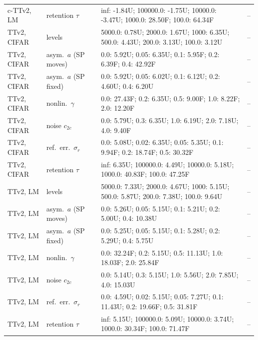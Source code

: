 \begin{table}[p]
\begin{tabular}{llp{8.8cm}l}
c-TTv2, LM & retention $\tau$ & inf: -1.84U; 100000.0: -1.75U; 10000.0: -3.47U; 1000.0: 28.50F; 100.0: 64.34F & --\\
TTv2, CIFAR & levels & 5000.0: 0.78U; 2000.0: 1.67U; 1000: 6.35U; 500.0: 4.43U; 200.0: 3.13U; 100.0: 3.12U & --\\
TTv2, CIFAR & asym.\ $a$ (SP moves) & 0.0: 5.92U; 0.05: 6.35U; 0.1: 5.95F; 0.2: 6.39F; 0.4: 42.92F & --\\
TTv2, CIFAR & asym.\ $a$ (SP fixed) & 0.0: 5.92U; 0.05: 6.02U; 0.1: 6.12U; 0.2: 4.60U; 0.4: 6.20U & --\\
TTv2, CIFAR & nonlin.\ $\gamma$ & 0.0: 27.43F; 0.2: 6.35U; 0.5: 9.00F; 1.0: 8.22F; 2.0: 12.20F & --\\
TTv2, CIFAR & noise $c_{2c}$ & 0.0: 5.79U; 0.3: 6.35U; 1.0: 6.19U; 2.0: 7.18U; 4.0: 9.40F & --\\
TTv2, CIFAR & ref.\ err.\ $\sigma_r$ & 0.0: 5.08U; 0.02: 6.35U; 0.05: 5.35U; 0.1: 9.94F; 0.2: 18.74F; 0.5: 30.32F & --\\
TTv2, CIFAR & retention $\tau$ & inf: 6.35U; 100000.0: 4.49U; 10000.0: 5.18U; 1000.0: 40.83F; 100.0: 47.25F & --\\
TTv2, LM & levels & 5000.0: 7.33U; 2000.0: 4.67U; 1000: 5.15U; 500.0: 5.87U; 200.0: 7.38U; 100.0: 9.64U & --\\
TTv2, LM & asym.\ $a$ (SP moves) & 0.0: 5.26U; 0.05: 5.15U; 0.1: 5.21U; 0.2: 5.00U; 0.4: 10.38U & --\\
TTv2, LM & asym.\ $a$ (SP fixed) & 0.0: 5.25U; 0.05: 5.15U; 0.1: 5.28U; 0.2: 5.29U; 0.4: 5.75U & --\\
TTv2, LM & nonlin.\ $\gamma$ & 0.0: 32.24F; 0.2: 5.15U; 0.5: 11.13U; 1.0: 18.03F; 2.0: 25.84F & --\\
TTv2, LM & noise $c_{2c}$ & 0.0: 5.14U; 0.3: 5.15U; 1.0: 5.56U; 2.0: 7.85U; 4.0: 15.03U & --\\
TTv2, LM & ref.\ err.\ $\sigma_r$ & 0.0: 4.59U; 0.02: 5.15U; 0.05: 7.27U; 0.1: 11.43U; 0.2: 19.66F; 0.5: 31.81F & --\\
TTv2, LM & retention $\tau$ & inf: 5.15U; 100000.0: 5.09U; 10000.0: 3.74U; 1000.0: 30.34F; 100.0: 71.47F & --\\
\bottomrule\end{tabular}\end{table}
